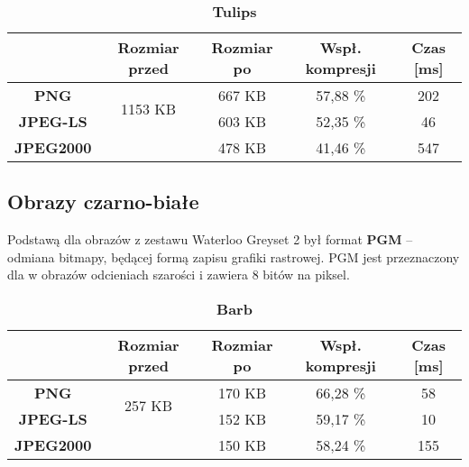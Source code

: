 \begin{table}[!h]
	\centering
	\caption{\textbf{Tulips}}
	\label{my-label}
	\begin{tabular}{|c|c|c|c|c|}                                             
		\hline
		& \textbf{Rozmiar przed} & \textbf{Rozmiar po} & \textbf{Wspł. kompresji} & \textbf{Czas {[}ms{]}} \\ \hline 
		\textbf{PNG}      &          \multicolumn{1}{c|}{\multirow{2}{*}{1153 KB}}             &        667 KB             &      57,88 \%                   &          202                   \\\cline{3-5}
		\textbf{JPEG-LS}  &                        &      603  KB             &       52,35 \%                  &          46                \\\cline{3-5}
		\textbf{JPEG2000} &                        &      478 KB               &       41,46 \%                  &     547                 \\ \hline
	\end{tabular}
\end{table}


\clearpage









\subsection{Obrazy czarno-białe}

Podstawą dla obrazów z zestawu Waterloo Greyset 2 był format \textbf{PGM} -- odmiana bitmapy, będącej formą zapisu grafiki rastrowej. PGM jest przeznaczony dla w obrazów odcieniach szarości i zawiera 8 bitów na piksel.

\begin{table}[h]
	\centering
	\caption{\textbf{Barb}}
	\label{my-label}
	\begin{tabular}{|c|c|c|c|c|}                                             
		\hline
		& \textbf{Rozmiar przed} & \textbf{Rozmiar po} & \textbf{Wspł. kompresji} & \textbf{Czas {[}ms{]}} \\ \hline 
		\textbf{PNG}      &          \multicolumn{1}{c|}{\multirow{2}{*}{257 KB}}             &      170 KB               &    66,28 \%                     &           58                  \\\cline{3-5}
		\textbf{JPEG-LS}  &                        &       152 KB              &        59,17 \%                 &        10                  \\\cline{3-5}
		\textbf{JPEG2000} &                        &     150 KB                &        58,24 \%                 &        155              \\ \hline
	\end{tabular}
\end{table}


